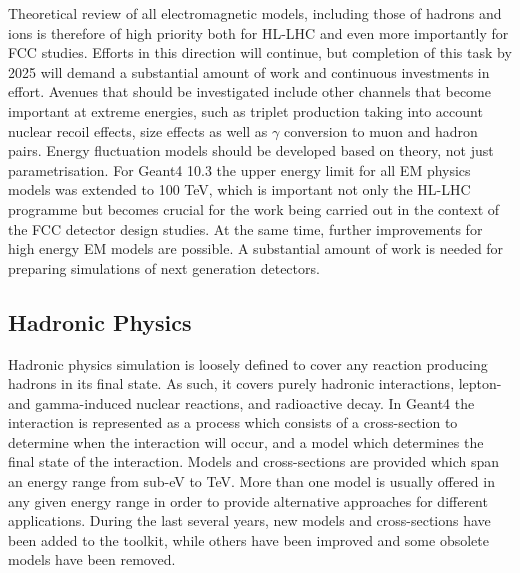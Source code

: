 \documentclass[12pt,a4paper]{article}
\begin{document}
Theoretical review of all electromagnetic models, including those of
hadrons and ions is therefore of high priority both for HL-LHC and even
more importantly for FCC studies. Efforts in this direction will
continue, but completion of this task by 2025 will demand a substantial
amount of work and continuous investments in effort. Avenues that should
be investigated include other channels that become important at extreme
energies, such as triplet production taking into account nuclear recoil
effects, size effects as well as $\gamma$ conversion to muon and hadron pairs.
Energy fluctuation models should be developed based on theory, not just
parametrisation. For Geant4 10.3 the upper energy limit for all EM
physics models was extended to 100 TeV, which is important not only the
HL-LHC programme but becomes crucial for the work being carried out in
the context of the FCC detector design studies. At the same time,
further improvements for high energy EM models are possible. A
substantial amount of work is needed for preparing simulations of next
generation detectors.

\hypertarget{hadronic-physics}{%
\subsection{Hadronic Physics}\label{hadronic-physics}}

Hadronic physics simulation is loosely defined to cover any reaction
producing hadrons in its final state. As such, it covers purely hadronic
interactions, lepton- and gamma-induced nuclear reactions, and
radioactive decay. In Geant4 the interaction is represented as a process
which consists of a cross-section to determine when the interaction will
occur, and a model which determines the final state of the interaction.
Models and cross-sections are provided which span an energy range from
sub-eV to TeV. More than one model is usually offered in any given
energy range in order to provide alternative approaches for different
applications. During the last several years, new models and
cross-sections have been added to the toolkit, while others have been
improved and some obsolete models have been removed.
\end{document}
